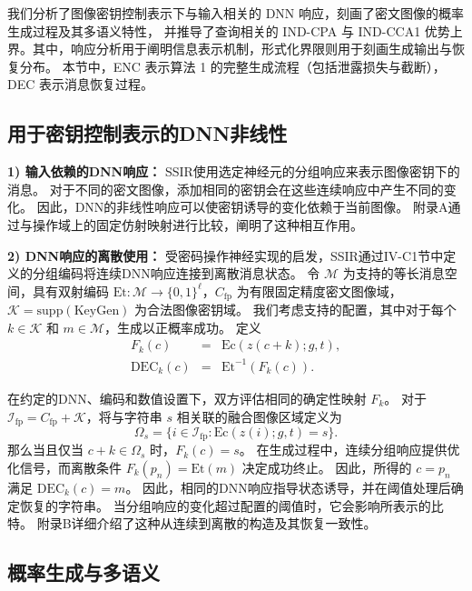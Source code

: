 我们分析了图像密钥控制表示下与输入相关的 DNN 响应，刻画了密文图像的概率生成过程及其多语义特性，
并推导了查询相关的 IND-CPA 与 IND-CCA1 优势上界。其中，响应分析用于阐明信息表示机制，形式化界限则用于刻画生成输出与恢复分布。
本节中，ENC 表示算法 1 的完整生成流程（包括泄露损失与截断），DEC 表示消息恢复过程。
\subsection*{用于密钥控制表示的DNN非线性}
\textbf{1) 输入依赖的DNN响应：}
SSIR使用选定神经元的分组响应来表示图像密钥下的消息。
对于不同的密文图像，添加相同的密钥会在这些连续响应中产生不同的变化。
因此，DNN的非线性响应可以使密钥诱导的变化依赖于当前图像。
附录A通过与操作域上的固定仿射映射进行比较，阐明了这种相互作用。

\textbf{2) DNN响应的离散使用：}
受密码操作神经实现\supercite{7-gerault-et-al-2026}的启发，SSIR通过IV-C1节中定义的分组编码将连续DNN响应连接到离散消息状态。
令 \(\mathcal{M}\) 为支持的等长消息空间，具有双射编码 \(\mathrm{Et} : \mathcal{M} \to \{0,1\}^\ell\)，\(C_{\mathrm{fp}}\) 为有限固定精度密文图像域，\(\mathcal{K} = \mathrm{supp}(\mathrm{KeyGen})\) 为合法图像密钥域。
我们考虑支持的配置，其中对于每个 \(k \in \mathcal{K}\) 和 \(m \in \mathcal{M}\)，生成以正概率成功。
定义
\begin{equation}
\begin{array}{rcl}
F_k(c) &=& \mathrm{Ec}(z(c+k); g, t), \\
\mathrm{DEC}_k(c) &=& \mathrm{Et}^{-1}(F_k(c)).
\end{array}
\end{equation}

在约定的DNN、编码和数值设置下，双方评估相同的确定性映射 \(F_k\)。
对于 \(\mathcal{I}_{\mathrm{fp}} = C_{\mathrm{fp}} + \mathcal{K}\)，将与字符串 \(s\) 相关联的融合图像区域定义为
\begin{equation}
\Omega_s = \{ i \in \mathcal{I}_{\mathrm{fp}} : \mathrm{Ec}(z(i); g, t) = s \}.
\end{equation}
那么当且仅当 \(c + k \in \Omega_s\) 时，\(F_k(c) = s\)。
在生成过程中，连续分组响应提供优化信号，而离散条件 \(F_k(p_n) = \mathrm{Et}(m)\) 决定成功终止。
因此，所得的 \(c = p_n\) 满足 \(\mathrm{DEC}_k(c) = m\)。
因此，相同的DNN响应指导状态诱导，并在阈值处理后确定恢复的字符串。
当分组响应的变化超过配置的阈值时，它会影响所表示的比特。
附录B详细介绍了这种从连续到离散的构造及其恢复一致性。

\subsection*{概率生成与多语义}

